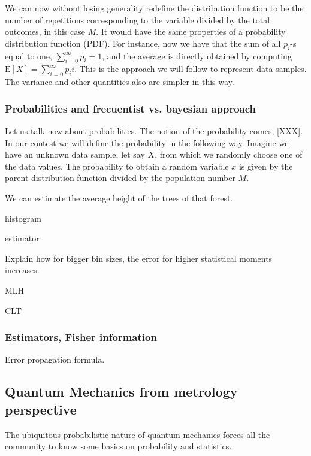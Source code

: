 We can now without losing generality redefine the distribution function to be the number of repetitions corresponding to the variable divided by the total outcomes, in this case $M$.
It would have the same properties of a probability distribution function (PDF).
For instance, now we have that the sum of all $p_i$-s equal to one, $\sum_{i=0}^\infty p_i = 1$, and the average is directly obtained by computing  $\text{E}[X] = \sum_{i=0}^\infty p_i i$.
This is the approach we will follow to represent data samples.
The variance and other quantities also are simpler in this way.

\subsubsection{Probabilities and frecuentist vs. bayesian approach}

Let us talk now about probabilities.
The notion of the probability comes, [XXX].
In our contest we will define the probability in the following way.
Imagine we have an unknown data sample, let say $X$, from which we randomly choose one of the data values.
The probability to obtain a random variable $x$ is given by the parent distribution function divided by the population number $M$.

We can estimate the average height of the trees of that forest.

histogram

estimator

Explain how for bigger bin sizes, the error for higher statistical moments increases.

MLH

CLT

\subsubsection{Estimators, Fisher information}

Error propagation formula.

\subsection{Quantum Mechanics from metrology perspective}

The ubiquitous probabilistic nature of quantum mechanics forces all the community to know some basics on probability and statistics.


